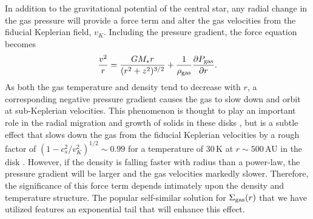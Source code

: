 In addition to the gravitational potential of the central star, any radial 
change in the gas pressure will provide a force term and alter the gas 
velocities from the fiducial Keplerian field, $v_K$.  Including the pressure 
gradient, the force equation becomes
\begin{equation}
\frac{v^2}{r} = \frac{G M_\ast r}{(r^2 + z^2)^{3/2}} + \frac{1}{\rho_{\rm gas}}\frac{\partial P_{\rm gas}}{\partial r}.
\end{equation} 
As both the gas temperature and density tend to decrease with $r$, a 
corresponding negative pressure gradient causes the gas to slow down and orbit 
at sub-Keplerian velocities.  This phenomenon is thought to play an important 
role in the radial migration and growth of solids in these disks 
\citep{weidenschilling77b,takeuchi02,birnstiel10}, but is a subtle effect that 
slows down the gas from the fiducial Keplerian velocities by a rough factor of 
$(1-c_s^2/v_K^2)^{1/2} \sim 0.99$ for a temperature of 30\,K at $r\sim 500$\,AU 
in the disk \citep{armitage09}.  However, if the density is falling faster with 
radius than a power-law, the pressure gradient will be larger and the gas 
velocities markedly slower.  Therefore, the significance of this force term 
depends intimately upon the density and temperature structure.  The popular 
self-similar solution for $\Sigma_{\rm gas}(r)$ that we have utilized features 
an exponential tail that will enhance this effect.  

